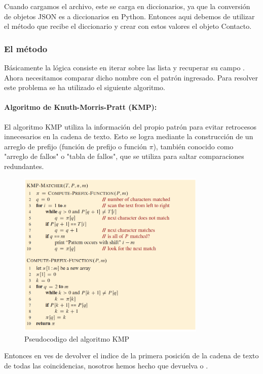 Cuando cargamos el archivo, este se carga en diccionarios, ya que la conversión de objetos JSON es a diccionarios en Python. Entonces aqui debemos de utilizar el método  que recibe el diccionario y crear con estos valores el objeto Contacto. 

\subsubsection{El método }
Básicamente la lógica consiste en iterar sobre las lista  y recuperar su campo .
\singlespacing
Ahora necesitamos comparar dicho nombre con el patrón ingresado. Para resolver este problema se ha utilizado el siguiente algoritmo.

\paragraph{Algoritmo de Knuth-Morris-Pratt (KMP):}
El algoritmo KMP utiliza la información del propio patrón para evitar retrocesos innecesarios en la cadena de texto. Esto se logra mediante la construcción de un arreglo de prefijo (función de prefijo o función $\pi$), también conocido como "arreglo de fallos" o "tabla de fallos", que se utiliza para saltar comparaciones redundantes.

\begin{figure}[H]
  \centering
  \includegraphics[width=0.8\textwidth]{img/kmp.png}
  \caption{Pseudocodigo del algoritmo KMP}
\end{figure}

Entonces en ves de devolver el indice de la primera posición de la cadena de texto de todas las coincidencias, nosotros hemos hecho que devuelva  o .


